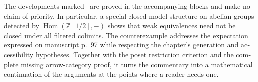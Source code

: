 \begin{otherlanguage}{english}
The developments marked \ours\ are proved in the accompanying blocks and make no claim of priority. In particular, a special closed model structure on abelian groups detected by $\operatorname{Hom}(\mathbb Z[1/2],-)$ shows that weak equivalences need not be closed under all filtered colimits. The counterexample addresses the expectation expressed on manuscript p.~97 while respecting the chapter's generation and accessibility hypotheses. Together with the poset restriction criterion and the complete missing arrow-category proof, it turns the commentary into a mathematical continuation of the arguments at the points where a reader needs one.
\end{otherlanguage}
\dgrchunkend
